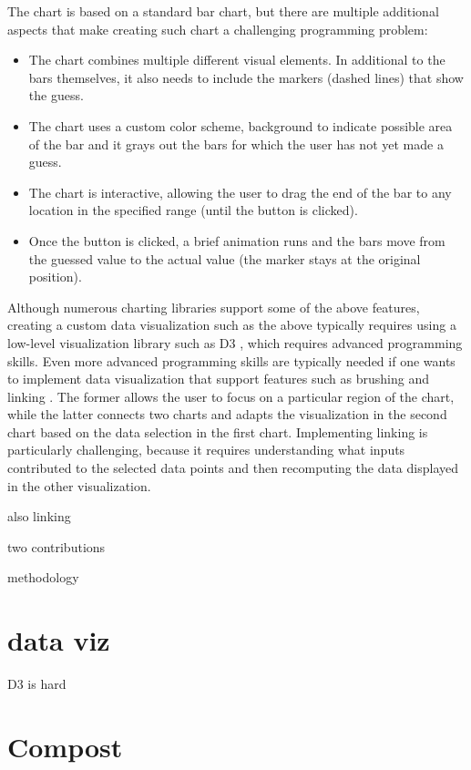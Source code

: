 \documentclass[fleqn,11pt]{report}
\theoremstyle{definition}
\newenvironment{nitemize}
{ \vspace{-0.4em}
  \begin{itemize}
    \setlength{\itemsep}{5pt}
    \setlength{\parskip}{0pt}
    \setlength{\parsep}{0pt} }
{ \end{itemize}
  \vspace{-0.4em} }
\begin{document}
The chart is based on a standard bar chart, but there are multiple additional aspects that
make creating such chart a challenging programming problem:

\begin{nitemize}
\item The chart combines multiple different visual elements. In additional to the bars themselves,
  it also needs to include the markers (dashed lines) that show the guess.
\item The chart uses a custom color scheme, background to indicate possible area of the bar and it
  grays out the bars for which the user has not yet made a guess.
\item The chart is interactive, allowing the user to drag the end of the bar to any location in
  the specified range (until the button is clicked).
\item Once the button is clicked, a brief animation runs and the bars move from the guessed
  value to the actual value (the marker stays at the original position).
\end{nitemize}

Although numerous charting libraries support some of the above features, creating a custom
data visualization such as the above typically requires using a low-level visualization library
such as D3 \citep{bostock-2011-d3}, which requires advanced programming skills. Even more
advanced programming skills are typically needed if one wants to implement data visualization
that support features such as brushing and linking \citep{buja-1991-linking}. The former allows
the user to focus on a particular region of the chart, while the latter connects two charts and
adapts the visualization in the second chart based on the data selection in the first chart.
Implementing linking is particularly challenging, because it requires understanding what
inputs contributed to the selected data points and then recomputing the data displayed in the
other visualization.


also linking

two contributions

methodology

\section{data viz}
D3 is hard

\section{Compost}
\end{document}
